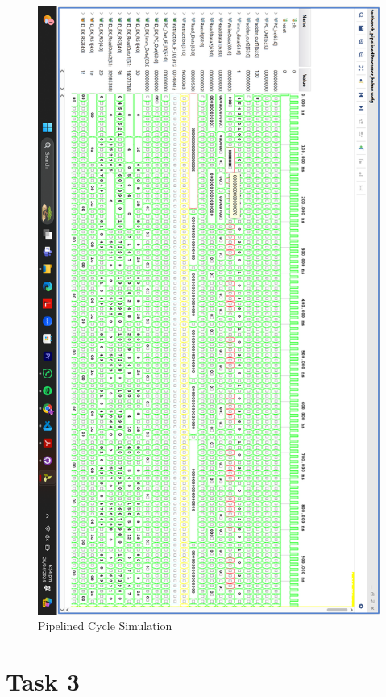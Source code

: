 \documentclass{report}
\begin{document}
\begin{figure}[h]
    \centerline{\includegraphics[scale = 0.2]{Pipelined.png}}
    \caption{Pipelined Cycle Simulation}
\end{figure}

\newpage

\section{Task 3}
\end{document}
